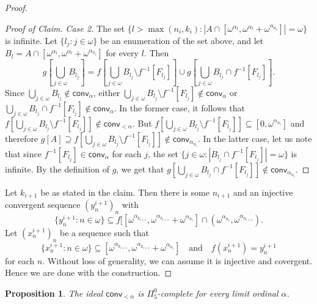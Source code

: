 \documentclass{amsart}
\theoremstyle{plain}
\newtheorem{proposition}[theorem]{Proposition}
\theoremstyle{definition}
\theoremstyle{remark}
\newcommand{\conv}{\mathsf{conv}}
\renewcommand{\subset}{\subseteq}
\begin{document}
\begin{proof}
\begin{proof}[Proof of Claim]
\emph{Case 2.} The set $\{l>\max(n_i,k_i) : |A\cap [\omega^{\alpha_l}, \omega^{\alpha_l}+\omega^{\alpha_{n_i}}]|=\omega\}$ is infinite.
Let $\{l_j :j\in\omega\}$ be an
enumeration of the set above, and let $B_l=A\cap [\omega^{\alpha_l}, \omega^{\alpha_l}+\omega^{\alpha_{n_i}}]$ for every $l$.
Then
$$g\left[\bigcup_{j\in\omega} B_{l_j}\right]=f\left[\bigcup_{j\in\omega} B_{l_j}\setminus f^{-1}[F_{l_j}]\right]\cup g\left[\bigcup_{j\in\omega} B_{l_j}\cap f^{-1}[F_{l_j} ]\right] .$$
Since $\bigcup_{j\in\omega} B_{l_j}\notin\conv_\alpha$, either $\bigcup_{j\in\omega} B_{l_j}\setminus f^{-1}[F_{l_j}]\notin\conv_\alpha$ or  $\bigcup_{j\in\omega} B_{l_j}\cap f^{-1}[F_{l_j} ]\not\in\conv_\alpha$. In the former case, it follows that $f[\bigcup_{j\in\omega} B_{l_j}\setminus f^{-1}[F_{l_j}]]\notin\conv_{<\alpha}$. But $f[\bigcup_{j\in\omega} B_{l_j}\setminus f^{-1}[F_{l_j}]]\subset [0,\omega^{\alpha_{n_i}}]$ and therefore $g[A]\supseteq f[\bigcup_{j\in\omega} B_{l_j}\setminus f^{-1}[F_{l_j}]]\notin\conv_{\alpha_{n_i}}$. In the latter case, let us note that since $f^{-1}[F_{l_j}]\in\conv_\alpha$ for each $j$, the set $\{j\in\omega : |B_{l_j}\cap f^{-1}[F_{l_j}]|=\omega\}$ is infinite. By the definition of $g$, we get that $ g[\bigcup_{j\in\omega} B_{l_j}\cap f^{-1}[F_{l_j} ]] \notin\conv_{\alpha_{n_i}}$.
\end{proof}
Let  $k_{i+1}$ be as  stated in the claim. Then there is some $n_{i+1}$ and an injective convergent sequence $(y^{i+1}_n)_n$ with $$\{y^{i+1}_n:n\in\omega\}\subset f[[\omega^{\alpha_{k_{i+1}}},\omega^{\alpha_{k_{i+1}}}+\omega^{\alpha_{n_i}}]\cap (\omega^{\alpha_{n_i}},\omega^{\alpha_{n_{i+1}}}). $$ 
 Let $ (x^{i+1}_n)_n$ be a sequence such that 
 $$\{x^{i+1}_n:n\in\omega \} \subset [\omega^{\alpha_{k_{i+1}}},\omega^{\alpha_{k_{i+1}}}+\omega^{\alpha_{n_i}}] \quad  \text{and} \quad f(x^{i+1}_n)=y^{i+1}_n$$ for each $n$. Without loss of generality, we can assume it is injective and covergent. Hence we are done with the construction.
\end{proof}



\begin{proposition}
   The ideal $\conv_{<\alpha}$ is $\Pi^0_5$-complete
   for every limit ordinal $\alpha$.
\end{proposition}
\end{document}
